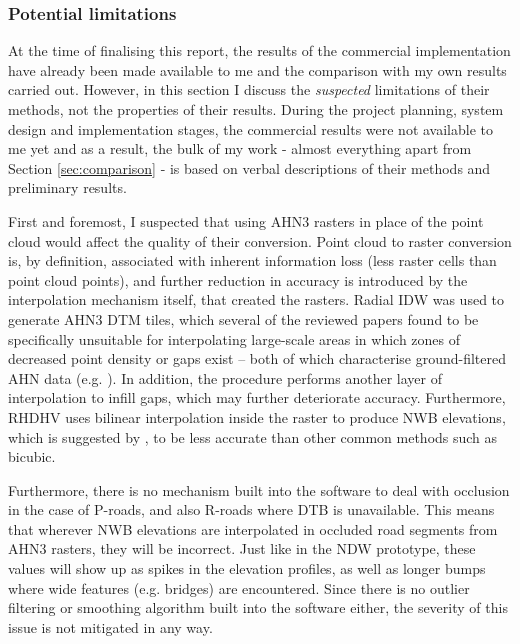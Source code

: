 \subsubsection{Potential limitations}

At the time of finalising this report, the results of the commercial implementation have already been made available to me and the comparison with my own results carried out. However, in this section I discuss the \textit{suspected} limitations of their methods, not the properties of their results. During the project planning, system design and implementation stages, the commercial results were not available to me yet and as a result, the bulk of my work - almost everything apart from Section \ref{sec:comparison} - is based on verbal descriptions of their methods and preliminary results.

First and foremost, I suspected that using AHN3 rasters in place of the point cloud would affect the quality of their conversion. Point cloud to raster conversion is, by definition, associated with inherent information loss (less raster cells than point cloud points), and further reduction in accuracy is introduced by the interpolation mechanism itself, that created the rasters. Radial IDW was used to generate AHN3 DTM tiles, which several of the reviewed papers found to be specifically unsuitable for interpolating large-scale areas in which zones of decreased point density or gaps exist – both of which characterise ground-filtered AHN data (e.g. \cite{guo_etal_2010}). In addition, the procedure performs another layer of interpolation to infill gaps, which may further deteriorate accuracy. Furthermore, RHDHV uses bilinear interpolation inside the raster to produce NWB elevations, which is suggested by \cite{shi_etal_2005}, to be less accurate than other common methods such as bicubic.

Furthermore, there is no mechanism built into the software to deal with occlusion in the case of P-roads, and also R-roads where DTB is unavailable. This means that wherever NWB elevations are interpolated in occluded road segments from AHN3 rasters, they will be incorrect. Just like in the NDW prototype, these values will show up as spikes in the elevation profiles, as well as longer bumps where wide features (e.g. bridges) are encountered. Since there is no outlier filtering or smoothing algorithm built into the software either, the severity of this issue is not mitigated in any way.

